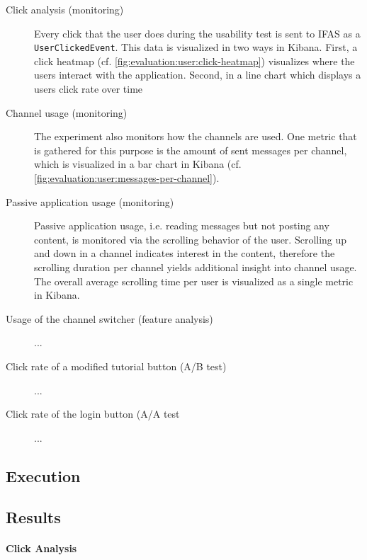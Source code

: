 \begin{description}
\item[Click analysis (monitoring)]
Every click that the user does during the usability test is sent to \ac{IFAS} as a \texttt{UserClickedEvent}.
This data is visualized in two ways in Kibana.
First, a click heatmap (cf. \cref{fig:evaluation:user:click-heatmap}) visualizes where the users interact with the application.
Second, in a line chart which displays a users click rate over time
\item[Channel usage (monitoring)]
The experiment also monitors how the channels are used.
One metric that is gathered for this purpose is the amount of sent messages per channel, which is visualized in a bar chart in Kibana (cf. \cref{fig:evaluation:user:messages-per-channel}).
\item[Passive application usage (monitoring)]
Passive application usage, i.e. reading messages but not posting any content, is monitored via the scrolling behavior of the user.
Scrolling up and down in a channel indicates interest in the content, therefore the scrolling duration per channel yields additional insight into channel usage.
The overall average scrolling time per user is visualized as a single metric in Kibana.
\item[Usage of the channel switcher (feature analysis)]
...
\item[Click rate of a modified tutorial button (A/B test)]
...
\item[Click rate of the login button (A/A test]
...
\end{description}


\subsection{Execution}

\subsection{Results}

\paragraph{Click Analysis}

